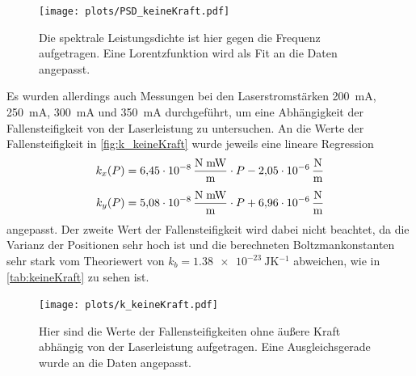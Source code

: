     \begin{figure}[ht]
        \centering\captionsetup{format=plain}
        \texttt{[image: plots/PSD\_keineKraft.pdf]} \vspace*{-0.5cm}
        \caption{Die spektrale Leistungsdichte ist hier gegen die Frequenz aufgetragen. Eine Lorentzfunktion wird als Fit an die Daten angepasst.}
        \label{fig:PSD_keineKraft}
    \end{figure}
    \FloatBarrier
    Es wurden allerdings auch Messungen bei den Laserstromstärken \qty{200}{mA}, \qty{250}{mA}, \qty{300}{mA} und \qty{350}{mA} durchgeführt, um eine Abhängigkeit der Fallensteifigkeit von der Laserleistung zu untersuchen.
    An die Werte der Fallensteifigkeit in \autoref{fig:k_keineKraft} wurde jeweils eine lineare Regression
    \begin{align*}
        k_x(P) &= \qty{6.45e-8}{\frac{\newton \; mW}{\metre}} \cdot P - \qty{2.05e-6}{\newton\per\metre} \\[4pt]
        k_y(P) &= \qty{5.08e-8}{\frac{\newton \; mW}{\metre}} \cdot P + \qty{6.96e-6}{\newton\per\metre}
    \end{align*}
    angepasst.
    Der zweite Wert der Fallensteifigkeit wird dabei nicht beachtet, da die Varianz der Positionen sehr hoch ist und die berechneten Boltzmankonstanten sehr stark vom Theoriewert von $k_b = \qty{1,38e-23}{\joule \kelvin^{-1}}$ abweichen, wie in \autoref{tab:keineKraft} zu sehen ist.
    \begin{figure}[ht]
        \centering\captionsetup{format=plain}
        \texttt{[image: plots/k\_keineKraft.pdf]} \vspace*{-0.5cm}
        \caption{Hier sind die Werte der Fallensteifigkeiten ohne äußere Kraft abhängig von der Laserleistung aufgetragen. Eine Ausgleichsgerade wurde an die Daten angepasst.}
        \label{fig:k_keineKraft}
    \end{figure}
    \FloatBarrier
